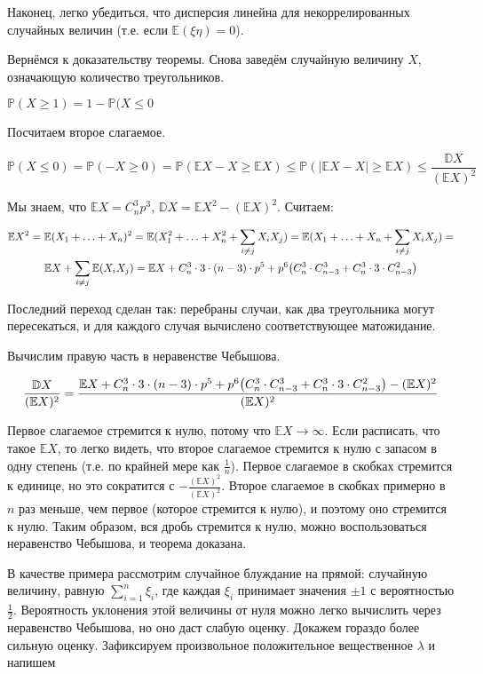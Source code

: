 \documentclass[12pt]{article}
\DeclarePairedDelimiter\autobracket{(}{)}
\newcommand{\br}[1]{\autobracket*{#1}}
\renewcommand{\P}{\mathbb{P}}
\newcommand{\E}{\mathbb{E}}
\newcommand{\D}{\mathbb{D}}
\begin{document}
\begin{enumerate}
Наконец, легко убедиться, что дисперсия линейна для некоррелированных случайных величин (т.е. если $\E(\xi \eta) = 0$).

Вернёмся к доказательству теоремы. Снова заведём случайную величину $X$, означающую количество треугольников.

$\P(X \geq 1) = 1 - \P(X \leq 0$

Посчитаем второе слагаемое.

\[
\P(X \leq 0) = \P(-X \geq 0) = \P(\E X - X \geq \E X) \leq
\P(|\E X - X| \geq \E X) \leq \frac {\D X} {(\E X)^2}
\]

Мы знаем, что $\E X = C^3_n p^3$, $\D X = \E X^2 - (\E X)^2$. Считаем:

\begin{multline*}
\E X^2 = \E (X_1 + \ldots + X_n)^2 =
\E (X_1^2 + \ldots + X_n^2 + \sum_{i \neq j} X_i X_j) =
\E (X_1 + \ldots + X_n + \sum_{i \neq j} X_i X_j) = \\
\E X + \sum_{i \neq j} \E (X_i X_j) =
\E X + C^3_n \cdot 3 \cdot (n - 3) \cdot p^5 + p^6 \br{C^3_n \cdot C^3_{n-3} + C^3_n \cdot 3 \cdot C^2_{n-3}}
\end{multline*}

Последний переход сделан так: перебраны случаи, как два треугольника могут пересекаться, и для каждого случая вычислено соответствующее матожидание.

Вычислим правую часть в неравенстве Чебышова.

\[
\frac {\D X} {(\E X)^2} =
\frac {\E X + C^3_n \cdot 3 \cdot (n - 3) \cdot p^5 + p^6 \br{C^3_n \cdot C^3_{n-3} + C^3_n \cdot 3 \cdot C^2_{n-3}} - (\E X)^2} {(\E X)^2}
\]

Первое слагаемое стремится к нулю, потому что $\E X \to \infty$. Если расписать, что такое $\E X$, то легко видеть, что второе слагаемое стремится к нулю с запасом в одну степень (т.е. по крайней мере как $\frac 1 n$). Первое слагаемое в скобках стремится к единице, но это сократится с $-\frac {(\E X)^2} {(\E X)^2}$. Второе слагаемое в скобках примерно в $n$ раз меньше, чем первое (которое стремится к нулю), и поэтому оно стремится к нулю. Таким образом, вся дробь стремится к нулю, можно воспользоваться неравенство Чебышова, и теорема доказана.
\end{enumerate}

В качестве примера рассмотрим случайное блуждание на прямой: случайную величину, равную $\sum_{i=1}^n \xi_i$, где каждая $\xi_i$ принимает значения $\pm 1$ с вероятностью $\frac 1 2$. Вероятность уклонения этой величины от нуля можно легко вычислить через неравенство Чебышова, но оно даст слабую оценку. Докажем гораздо более сильную оценку. Зафиксируем произвольное положительное вещественное $\lambda$ и напишем
\end{document}
